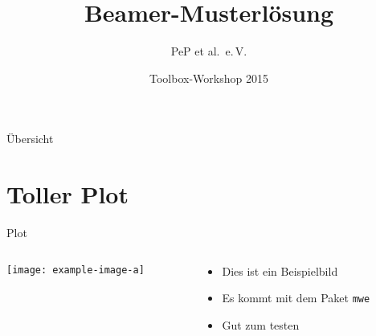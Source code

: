 \documentclass[professionalfonts]{beamer}
\author{PeP et al.\ e.\,V.}
\institute{TU Dortmund}
\date{Toolbox-Workshop 2015}
\title{Beamer-Musterlösung}
\begin{document}
\begin{frame}
  \maketitle
\end{frame}
\begin{frame}{Übersicht}
  \maketitle
\end{frame}

\section{Toller Plot}
\begin{frame}{Plot}
  \begin{columns}[c, onlytextwidth]
    \begin{column}{0.47\textwidth}
      \texttt{[image: example-image-a]}
    \end{column}
    \begin{column}{0.47\textwidth}
      \begin{itemize}
        \item Dies ist ein Beispielbild
        \item Es kommt mit dem Paket \texttt{mwe}
        \item Gut zum testen
      \end{itemize}
    \end{column}
  \end{columns} 
\end{frame}
\end{document}
